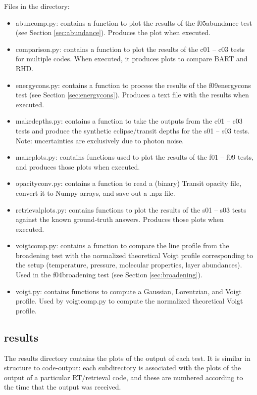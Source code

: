 \documentclass[letterpaper, 12pt]{article}
\begin{document}
Files in the directory:
\begin{itemize} \itemsep0pt
  \item abuncomp.py: contains a function to plot the results of the f05abundance test (see Section \ref{sec:abundance}). Produces the plot when executed.
  \item comparison.py: contains a function to plot the results of the c01 -- c03 tests for multiple 
        codes. When executed, it produces plots to compare BART and RHD.
  \item energycons.py: contains a function to process the results of the f09energycons test (see Section \ref{sec:energycons}). Produces a text file with the results when executed.
  \item makedepths.py: contains a function to take the outputs from the c01 -- c03 tests and produce the synthetic eclipse/transit depths for the s01 -- s03 tests. Note: uncertainties are exclusively due to photon noise.
  \item makeplots.py: contains functions used to plot the results of the f01 -- f09 tests, 
        and produces those plots when executed.
  \item opacityconv.py: contains a function to read a (binary) Transit opacity 
        file, convert it to Numpy arrays, and save out a .npz file.
  \item retrievalplots.py: contains functions to plot the results of the s01 -- s03 tests against the known ground-truth answers. Produces those plots when executed.
  \item voigtcomp.py: contains a function to compare the line profile from the 
        broadening test with the normalized theoretical Voigt profile 
        corresponding to the setup (temperature, pressure, molecular 
        properties, layer abundances). Used in the f04broadening test (see 
        Section \ref{sec:broadening}).
  \item voigt.py: contains functions to compute a Gaussian, Lorentzian, and 
        Voigt profile. Used by voigtcomp.py to compute the normalized 
        theoretical Voigt profile.
\end{itemize}

\subsection{results}
\label{sec:results}
The results directory contains the plots of the output of each test. It is 
similar in structure to code-output: each subdirectory is associated with 
the plots of the output of a particular RT/retrieval code, and these are numbered 
according to the time that the output was received. 
\end{document}

